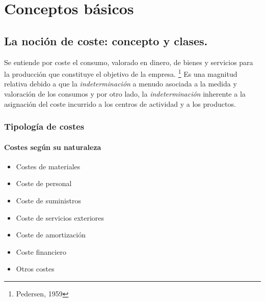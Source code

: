 \documentclass[12pt]{report} %
\providecommand{\tightlist}{%
  \setlength{\itemsep}{0pt}\setlength{\parskip}{0pt}}
\begin{document}




\hypertarget{conceptos-buxe1sicos}{%
\chapter{Conceptos básicos}\label{conceptos-buxe1sicos}}

\hypertarget{la-nociuxf3n-de-coste-concepto-y-clases.}{%
\section{La noción de coste: concepto y
clases.}\label{la-nociuxf3n-de-coste-concepto-y-clases.}}

\begin{definicion}[Coste]
Se entiende por coste el consumo, valorado en dinero, de bienes y servicios para la producción que constituye el objetivo de la empresa. \footnote{Pedersen, 1959} Es una magnitud relativa debido a que la \textit{indeterminación} a menudo asociada a la medida y valoración de los consumos y por otro lado, la \textit{indeterminación} inherente a la asignación del coste incurrido a los centros de actividad y a los productos.
\end{definicion}

\hypertarget{tipologuxeda-de-costes}{%
\subsection{Tipología de costes}\label{tipologuxeda-de-costes}}

\hypertarget{costes-seguxfan-su-naturaleza}{%
\subsubsection{Costes según su
naturaleza}\label{costes-seguxfan-su-naturaleza}}

\begin{itemize}
\tightlist
\item
  Costes de materiales
\item
  Coste de personal
\item
  Coste de suministros
\item
  Coste de servicios exteriores
\item
  Coste de amortización
\item
  Coste financiero
\item
  Otros costes
\end{itemize}
\end{document}

